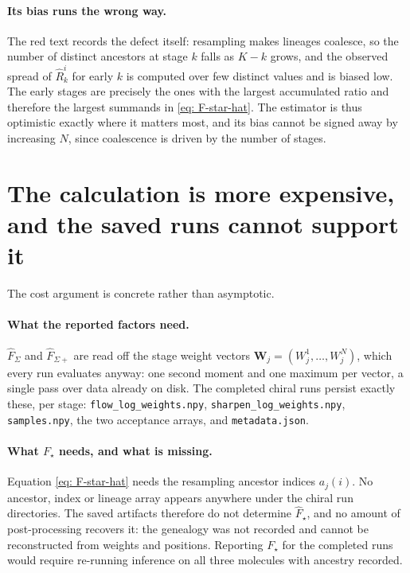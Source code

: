 \documentclass[11pt]{article}
\theoremstyle{plain}
\begin{document}
\paragraph{Its bias runs the wrong way.} The red text records the defect
itself: resampling makes lineages coalesce, so the number of distinct
ancestors at stage $k$ falls as $K-k$ grows, and the observed spread of
$\hat R_k^i$ for early $k$ is computed over few distinct values and is biased
low. The early stages are precisely the ones with the largest accumulated
ratio and therefore the largest summands in \eqref{eq: F-star-hat}. The
estimator is thus optimistic exactly where it matters most, and its bias
cannot be signed away by increasing $N$, since coalescence is driven by the
number of stages.

\section{The calculation is more expensive, and the saved runs cannot support it}

The cost argument is concrete rather than asymptotic.

\paragraph{What the reported factors need.} $\hat F_\Sigma$ and
$\hat F_{\Sigma+}$ are read off the stage weight vectors
$\mathbf W_j=(W_j^1,\dots,W_j^N)$, which every run evaluates anyway: one
second moment and one maximum per vector, a single pass over data already on
disk. The completed chiral runs persist exactly these, per stage:
\texttt{flow\_log\_weights.npy}, \texttt{sharpen\_log\_weights.npy},
\texttt{samples.npy}, the two acceptance arrays, and \texttt{metadata.json}.

\paragraph{What $F_\star$ needs, and what is missing.} Equation
\eqref{eq: F-star-hat} needs the resampling ancestor indices $a_j(i)$. No
ancestor, index or lineage array appears anywhere under the chiral run
directories. The saved artifacts therefore do not determine $\hat F_\star$,
and no amount of post-processing recovers it: the genealogy was not recorded
and cannot be reconstructed from weights and positions. Reporting $F_\star$
for the completed runs would require re-running inference on all three
molecules with ancestry recorded.
\end{document}
